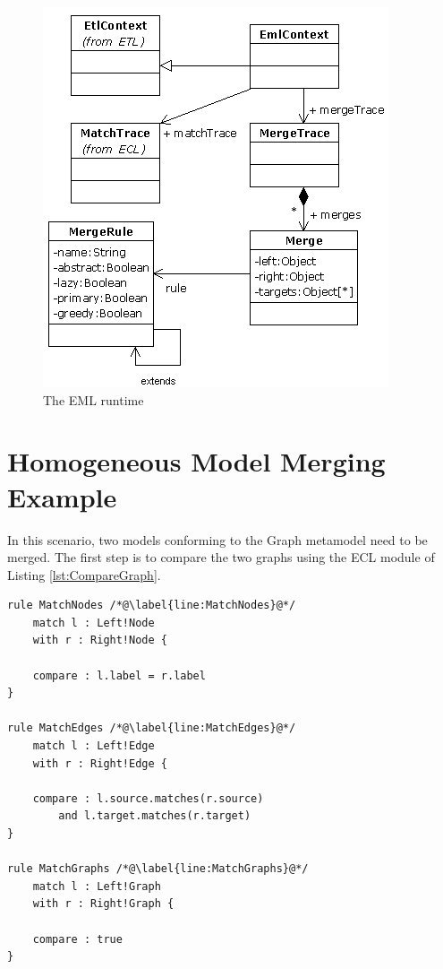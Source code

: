 \begin{figure}
	\centering
		\includegraphics{images/EmlRuntime.png}
	\caption{The EML runtime}
	\label{fig:EmlRuntime}
\end{figure}

\section{Homogeneous Model Merging Example}

In this scenario, two models conforming to the Graph metamodel need to be merged. The first step is to compare the two graphs using the ECL module of Listing \ref{lst:CompareGraph}.

\begin{lstlisting}[float=tbp, caption=ECL module for comparing two instances of the Graph metamodel, label=lst:CompareGraph, language=ECL, tabsize=2]
rule MatchNodes /*@\label{line:MatchNodes}@*/
	match l : Left!Node
	with r : Right!Node {

	compare : l.label = r.label
}

rule MatchEdges /*@\label{line:MatchEdges}@*/
	match l : Left!Edge
	with r : Right!Edge {

	compare : l.source.matches(r.source)
		and l.target.matches(r.target)
}

rule MatchGraphs /*@\label{line:MatchGraphs}@*/
	match l : Left!Graph
	with r : Right!Graph {

	compare : true
}
\end{lstlisting}

